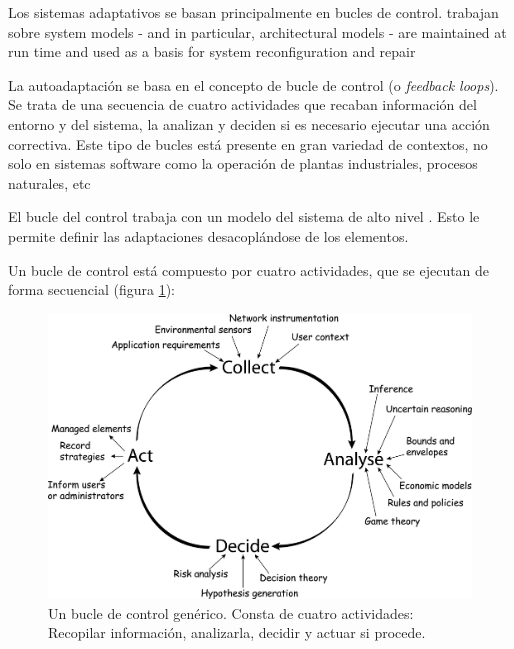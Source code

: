 Los sistemas adaptativos se basan principalmente en bucles de control. trabajan sobre system models - and in particular, architectural models - are maintained at run time
and used as a basis for system reconfiguration and repair \cite{garlanIncreasingSystemDependability2003}

La autoadaptación se basa en el concepto de bucle de control (o \emph{feedback loops}). Se trata de una secuencia de cuatro actividades que recaban información del entorno y del sistema, la analizan y deciden si es necesario ejecutar una acción correctiva.  Este tipo de bucles está presente en gran variedad de contextos, no solo en sistemas software como la operación de plantas industriales, procesos naturales, etc

El bucle del control trabaja con un modelo del sistema de alto nivel \cite{garlanIncreasingSystemDependability2003}. Esto le permite definir las adaptaciones desacoplándose de los elementos.

Un bucle de control está compuesto por cuatro actividades, que se ejecutan de forma secuencial (figura \ref{fig:bucle-control}):

\begin{figure}[h]
  \centering
  \includegraphics[scale=0.07]{01_introduccion/images/feedback-loop}
  \caption[Un bucle de control genérico. Consta de cuatro actividades: Recopilar información, analizarla, decidir y actuar si procede.]{Un bucle de control genérico. Consta de cuatro actividades: Recopilar información, analizarla, decidir y actuar si procede. \cite{dobsonSurveyAutonomicCommunications2006}}
  \label{fig:bucle-control}
\end{figure}

